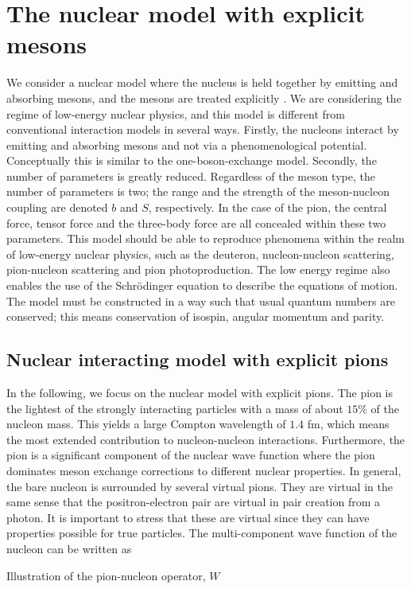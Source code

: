 \chapter{The nuclear model with explicit mesons}\label{Decsofmodel}
We consider a nuclear model where the nucleus is held together by emitting and absorbing mesons, and the mesons are treated explicitly \cite[]{Mesons}. We are considering the regime of low-energy nuclear physics, and this model is different from conventional interaction models in several ways. Firstly, the nucleons interact by emitting and absorbing mesons and not via a phenomenological potential. Conceptually this is similar to the one-boson-exchange model. Secondly, the number of parameters is greatly reduced. Regardless of the meson type, the number of parameters is two; the range and the strength of the meson-nucleon coupling are denoted $b$ and $S$, respectively. In the case of the pion, the central force, tensor force and the three-body force are all concealed within these two parameters. This model should be able to reproduce phenomena within the realm of low-energy nuclear physics, such as the deuteron, nucleon-nucleon scattering, pion-nucleon scattering and pion photoproduction. The low energy regime also enables the use of the Schrödinger equation to describe the equations of motion. The model must be constructed in a way such that usual quantum numbers are conserved; this means conservation of isospin, angular momentum and parity. 

\section{Nuclear interacting model with explicit pions }\label{sec:model}

In the following, we focus on the nuclear model with explicit pions. The pion is the lightest of the strongly interacting particles with a mass of about $15\%$ of the nucleon mass. This yields a large Compton wavelength of $1.4$ fm, which means the most extended contribution to nucleon-nucleon interactions. Furthermore, the pion is a significant component of the nuclear wave function where the pion dominates meson exchange corrections to different nuclear properties. In general, the bare nucleon is surrounded by several virtual pions. 
They are virtual in the same sense that the positron-electron pair are virtual in pair creation from a photon. It is important to stress that these are virtual since they can have properties possible for true particles. The multi-component wave function of the nucleon can be written as
\begin{marginfigure}
	\centering
	
	\caption{Illustration of the pion-nucleon operator, $W$}
	\label{fig:superposition}
\end{marginfigure}

